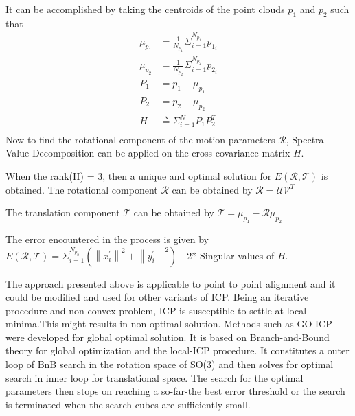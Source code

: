 It can be accomplished by taking the centroids of the point clouds $p_1$ and $p_2$ such that
\begin{equation}
    \begin{aligned}
        \mu_{p_1}&= \frac{1}{N_{p_1}} \Sigma_{i=1}^{N_{p_1}} p_{1_i}\\

        \mu_{p_2}&= \frac{1}{N_{p_2}} \Sigma_{i=1}^{N_{p_2}} p_{2_i}\\

        P_1&= p_1 - \mu_{p_1}\\
        P_2&= p_2 - \mu_{p_2}\\

        H&\triangleq  \Sigma_{i=1}^{N} P_1 P_2^T\\
    \end{aligned}
\end{equation}
Now to find the rotational component of the motion parameters $\mathcal{R}$, 
Spectral Value Decomposition can be applied on the cross covariance matrix $H$.

When the rank(H) = 3, then a unique and optimal solution for $E(\mathcal{R}, \mathcal{T})$ is obtained.
The rotational component $\mathcal{R}$ can be obtained by 
$\mathcal{R} = \mathcal{U} \mathcal{V}^T$

The translation component $\mathcal{T}$ can be obtained by 
$\mathcal{T} = \mu_{p_1} - \mathcal{R}\mu_{p_2} $

The error encountered in the process is given by 
$E(\mathcal{R}, \mathcal{T}) = \Sigma_{i=1}^{N_{p_2}}(\left\lVert x_i^{'} \right\rVert^2 + \left\lVert y_i^{'} \right\rVert^2)$ - 2* Singular values of $H$.

The approach presented above is applicable to point to point alignment and it could be modified and used for other variants of ICP. Being an iterative procedure and non-convex problem, ICP is susceptible to settle at local 
minima.This might results in non optimal solution. Methods such as GO-ICP \cite{Yang_2016} were developed for global optimal solution. It is based on Branch-and-Bound theory for global optimization and the local-ICP procedure.
It constitutes a outer loop of BnB search in the rotation space of SO(3) and then solves for optimal search in inner loop for translational space. The search for the optimal parameters then stops on reaching
a so-far-the best error threshold or the search is terminated when the search cubes are sufficiently small. 
\par
